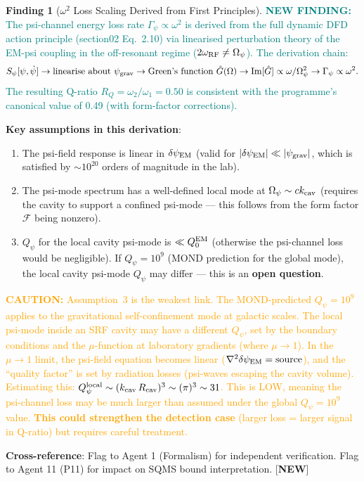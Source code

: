 \documentclass[11pt]{article}
\newcommand{\Opsi}{\Omega_\psi}
\newcommand{\Qpsi}{Q_\psi}
\newcommand{\psigrav}{\psi_{\rm grav}}
\newcommand{\dpsiEM}{\delta\psi_{\rm EM}}
\newcommand{\caution}[1]{\textcolor{orange}{\textbf{CAUTION:} #1}}
\newcommand{\newfinding}[1]{\textcolor{teal}{\textbf{NEW FINDING:} #1}}
\theoremstyle{definition}
\newtheorem{finding}[theorem]{Finding}
\theoremstyle{remark}
\begin{document}
\begin{finding}[$\omega^2$ Loss Scaling Derived from First Principles]
\label{find:omega2}
\newfinding{The psi-channel energy loss rate $\Gamma_\psi \propto
\omega^2$ is derived from the full dynamic DFD action principle
(section02 Eq.~2.10) via linearised perturbation theory of the
EM-psi coupling in the off-resonant regime ($2\omega_{\rm RF} \neq
\Opsi$). The derivation chain:
\[
S_\psi[\psi, \dot\psi] \to \text{linearise about } \psigrav \to
\text{Green's function } \hat{G}(\Omega) \to
\text{Im}[\hat{G}] \propto \omega/\Opsi^2 \to
\Gamma_\psi \propto \omega^2.
\]
The resulting Q-ratio $R_Q = \omega_2/\omega_1 = 0.50$ is consistent
with the programme's canonical value of 0.49 (with form-factor
corrections).}

\textbf{Key assumptions in this derivation}:
\begin{enumerate}[nosep]
\item The psi-field response is linear in $\dpsiEM$ (valid for
  $|\dpsiEM| \ll |\psigrav|$, which is satisfied by $\sim 10^{20}$
  orders of magnitude in the lab).
\item The psi-mode spectrum has a well-defined local mode at
  $\Opsi \sim c k_{\rm cav}$ (requires the cavity to support a
  confined psi-mode --- this follows from the form factor $\mathcal{F}$
  being nonzero).
\item $\Qpsi$ for the local cavity psi-mode is $\ll Q_0^{\rm EM}$
  (otherwise the psi-channel loss would be negligible). If $\Qpsi
  = 10^9$ (MOND prediction for the global mode), the local cavity
  psi-mode $\Qpsi$ may differ --- this is an \textbf{open question}.
\end{enumerate}

\caution{Assumption~3 is the weakest link. The MOND-predicted
$\Qpsi = 10^9$ applies to the gravitational self-confinement mode
at galactic scales. The local psi-mode inside an SRF cavity may have
a different $\Qpsi$, set by the boundary conditions and the
$\mu$-function at laboratory gradients (where $\mu \to 1$). In the
$\mu \to 1$ limit, the psi-field equation becomes linear
($\nabla^2 \dpsiEM = \text{source}$), and the ``quality factor'' is
set by radiation losses (psi-waves escaping the cavity volume).
Estimating this: $\Qpsi^{\rm local} \sim (k_{\rm cav}\,R_{\rm cav})^3
\sim (\pi)^3 \sim 31$. This is LOW, meaning the psi-channel loss may
be much larger than assumed under the global $\Qpsi = 10^9$ value.
\textbf{This could strengthen the detection case} (larger loss =
larger signal in Q-ratio) but requires careful treatment.}

\textbf{Cross-reference}: Flag to Agent 1 (Formalism) for
independent verification. Flag to Agent 11 (P11) for impact on
SQMS bound interpretation.
[\textbf{NEW}]
\end{finding}
\end{document}
